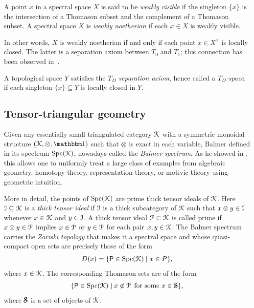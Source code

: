 \documentclass[reqno,a4paper]{amsart}
\begin{document}
\begin{definition} \cite[Definitions~2.1 and~2.3]{bhs23}
A point $x$ in a spectral space $X$ is said to be \emph{weakly visible} if the singleton $\{x\}$ is the intersection of a Thomason subset and the complement of a Thomason subset.
A spectral space $X$ is \emph{weakly noetherian} if each $x\in X$ is weakly visible.
\end{definition}

In other words, $X$ is weakly noetherian if and only if each point $x\in X^\vee$ is locally closed. The latter is a separation axiom between $T_0$ and $T_1$; this connection has been observed in~\cite{bigspectra}.

\begin{definition}\label{def:T_D}
A topological space $Y$ satisfies the \emph{$T_D$ separation axiom}, hence called a \emph{$T_D$-space}, if each singleton $\{x\}\subseteq Y$ is locally closed in $Y$.
\end{definition}

\subsection{Tensor-triangular geometry}

Given any essentially small triangulated category $\mathcal{K}$ with a symmetric monoidal structure $(\cK,\otimes,\unit)$ such that $\otimes$ is exact in each variable, Balmer defined in \cite{balmer_spectrum} its spectrum $\operatorname{Spc}(\mathcal{K})$, nowadays called the \emph{Balmer spectrum}.
As he showed in \cite{balmer-ICM}, this allows one to uniformly treat a large class of examples from algebraic geometry, homotopy theory, representation theory, or motivic theory using geometric intuition.

More in detail, the points of $\operatorname{Spc}(\mathcal{K})$ are prime thick tensor ideals of $\mathcal{K}$. Here $\operatorname{\mathcal{I}}\subseteq\mathcal{K}$ is a \emph{thick tensor ideal} if $\operatorname{\mathcal{I}}$ is a thick subcategory of $\mathcal{K}$ such that $x\otimes y\in\operatorname{\mathcal{I}}$ whenever $x\in\mathcal{K}$ and $y\in\operatorname{\mathcal{I}}$. A thick tensor ideal $\operatorname{\mathcal{P}}\subset\mathcal{K}$ is called prime if $x\otimes y\in\operatorname{\mathcal{P}}$ implies $x\in\operatorname{\mathcal{P}}$ or $y\in\operatorname{\mathcal{P}}$ for each pair $x,y\in\mathcal{K}$. The Balmer spectrum carries the \emph{Zariski topology} that makes it a spectral space and whose quasi-compact open sets are precisely those of the form
\[ D(x) = \{ \mathsf{P}\in\operatorname{Spc}(\mathcal{K}) \mid x\in P \}, \]
where $x\in\mathcal{K}$. The corresponding Thomason sets are of the form
\[ \{ \mathsf{P}\in\operatorname{Spc}(\mathcal{K}) \mid x\not\in\operatorname{\mathcal{P}} \text{ for some } x\in\operatorname{\boldsymbol{\mathcal{S}}} \}, \]
where $\operatorname{\boldsymbol{\mathcal{S}}}$ is a set of objects of $\mathcal{K}$.
\end{document}
